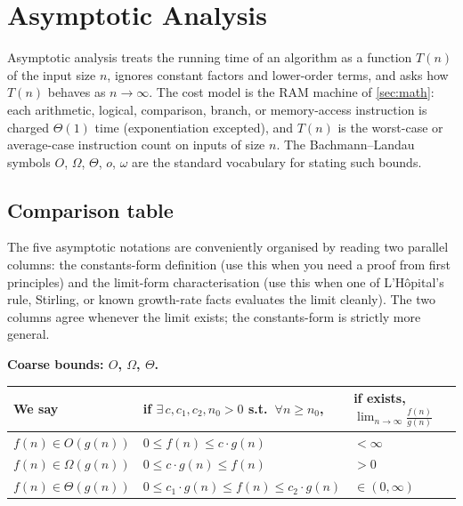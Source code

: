 \section{Asymptotic Analysis}
\label{sec:asymptotic}

Asymptotic analysis treats the running time of an algorithm as a function $T(n)$ of the input size $n$, ignores constant factors and lower-order terms, and asks how $T(n)$ behaves as $n \to \infty$. The cost model is the RAM machine of \cref{sec:math}: each arithmetic, logical, comparison, branch, or memory-access instruction is charged $\Theta(1)$ time (exponentiation excepted), and $T(n)$ is the worst-case or average-case instruction count on inputs of size $n$. The Bachmann--Landau symbols $O$, $\Omega$, $\Theta$, $o$, $\omega$ are the standard vocabulary for stating such bounds.

\subsection{Comparison table}

The five asymptotic notations are conveniently organised by reading two parallel columns: the constants-form definition (use this when you need a proof from first principles) and the limit-form characterisation (use this when one of L'H\^opital's rule, Stirling, or known growth-rate facts evaluates the limit cleanly). The two columns agree whenever the limit exists; the constants-form is strictly more general.

\medskip
\noindent\textbf{Coarse bounds: $O$, $\Omega$, $\Theta$.}
\begin{center}
\begin{tabular}{lll}
\toprule
We say               & if $\exists\, c, c_1, c_2, n_0 > 0$ s.t.\ $\forall n \ge n_0$, & if exists, $\displaystyle\lim_{n\to\infty} \frac{f(n)}{g(n)}$ \\
\midrule
$f(n) \in O(g(n))$       & $0 \le f(n) \le c \cdot g(n)$                       & $< \infty$           \\
$f(n) \in \Omega(g(n))$  & $0 \le c \cdot g(n) \le f(n)$                       & $> 0$                \\
$f(n) \in \Theta(g(n))$  & $0 \le c_1 \cdot g(n) \le f(n) \le c_2 \cdot g(n)$  & $\in (0, \infty)$    \\
\bottomrule
\end{tabular}
\end{center}

